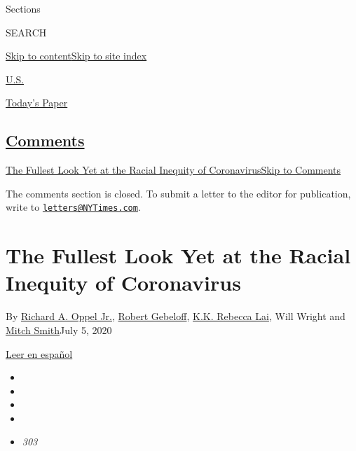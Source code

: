 Sections

SEARCH

\protect\hyperlink{site-content}{Skip to
content}\protect\hyperlink{site-index}{Skip to site index}

\href{https://www.nytimes3xbfgragh.onion/section/us}{U.S.}

\href{https://myaccount.nytimes3xbfgragh.onion/auth/login?response_type=cookie\&client_id=vi}{}

\href{https://www.nytimes3xbfgragh.onion/section/todayspaper}{Today's
Paper}

\hypertarget{comments}{%
\subsection{\texorpdfstring{\protect\hyperlink{commentsContainer}{Comments}}{Comments}}\label{comments}}

\href{}{The Fullest Look Yet at the Racial Inequity of
Coronavirus}\href{}{Skip to Comments}

The comments section is closed. To submit a letter to the editor for
publication, write to
\href{mailto:letters@NYTimes.com}{\nolinkurl{letters@NYTimes.com}}.

\hypertarget{the-fullest-look-yet-at-the-racial-inequity-of-coronavirus}{%
\section{The Fullest Look Yet at the Racial Inequity of
Coronavirus}\label{the-fullest-look-yet-at-the-racial-inequity-of-coronavirus}}

By
\href{https://www.nytimes3xbfgragh.onion/by/richard-a-oppel-jr}{Richard
A. Oppel Jr.},
\href{https://www.nytimes3xbfgragh.onion/by/robert-gebeloff}{Robert
Gebeloff},
\href{https://www.nytimes3xbfgragh.onion/by/kk-rebecca-lai}{K.K. Rebecca
Lai}, Will Wright and
\href{https://www.nytimes3xbfgragh.onion/by/mitch-smith}{Mitch
Smith}July 5, 2020

\href{https://www.nytimes3xbfgragh.onion/es/interactive/2020/07/09/espanol/mundo/coronavirus-latinos-africanoamericanos-datos.html}{Leer
en español}

\begin{itemize}
\item
\item
\item
\item
\item
  \emph{303}
\end{itemize}


